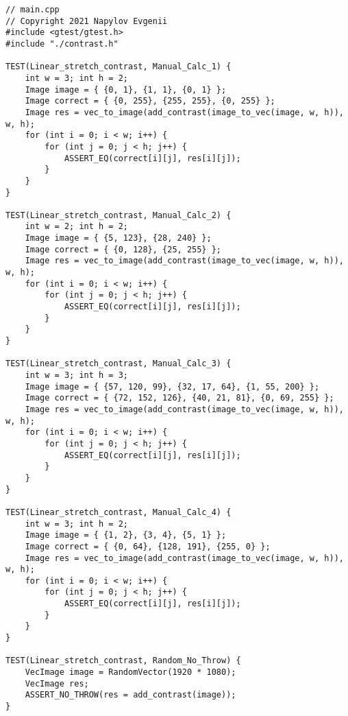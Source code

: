 \documentclass{report}
\begin{document}
\begin{lstlisting}
// main.cpp
// Copyright 2021 Napylov Evgenii
#include <gtest/gtest.h>
#include "./contrast.h"

TEST(Linear_stretch_contrast, Manual_Calc_1) {
    int w = 3; int h = 2;
    Image image = { {0, 1}, {1, 1}, {0, 1} };
    Image correct = { {0, 255}, {255, 255}, {0, 255} };
    Image res = vec_to_image(add_contrast(image_to_vec(image, w, h)), w, h);
    for (int i = 0; i < w; i++) {
        for (int j = 0; j < h; j++) {
            ASSERT_EQ(correct[i][j], res[i][j]);
        }
    }
}

TEST(Linear_stretch_contrast, Manual_Calc_2) {
    int w = 2; int h = 2;
    Image image = { {5, 123}, {28, 240} };
    Image correct = { {0, 128}, {25, 255} };
    Image res = vec_to_image(add_contrast(image_to_vec(image, w, h)), w, h);
    for (int i = 0; i < w; i++) {
        for (int j = 0; j < h; j++) {
            ASSERT_EQ(correct[i][j], res[i][j]);
        }
    }
}

TEST(Linear_stretch_contrast, Manual_Calc_3) {
    int w = 3; int h = 3;
    Image image = { {57, 120, 99}, {32, 17, 64}, {1, 55, 200} };
    Image correct = { {72, 152, 126}, {40, 21, 81}, {0, 69, 255} };
    Image res = vec_to_image(add_contrast(image_to_vec(image, w, h)), w, h);
    for (int i = 0; i < w; i++) {
        for (int j = 0; j < h; j++) {
            ASSERT_EQ(correct[i][j], res[i][j]);
        }
    }
}

TEST(Linear_stretch_contrast, Manual_Calc_4) {
    int w = 3; int h = 2;
    Image image = { {1, 2}, {3, 4}, {5, 1} };
    Image correct = { {0, 64}, {128, 191}, {255, 0} };
    Image res = vec_to_image(add_contrast(image_to_vec(image, w, h)), w, h);
    for (int i = 0; i < w; i++) {
        for (int j = 0; j < h; j++) {
            ASSERT_EQ(correct[i][j], res[i][j]);
        }
    }
}

TEST(Linear_stretch_contrast, Random_No_Throw) {
    VecImage image = RandomVector(1920 * 1080);
    VecImage res;
    ASSERT_NO_THROW(res = add_contrast(image));
}


	\end{lstlisting}
	
\end{document}
